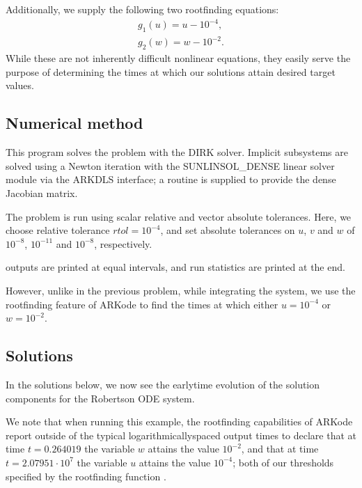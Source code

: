 \documentclass[letterpaper,10pt,english]{sphinxmanual}
\begin{document}
\sphinxAtStartPar
Additionally, we supply the following two root\sphinxhyphen{}finding equations:
\begin{equation*}
\begin{split}g_1(u) = u - 10^{-4}, \\
g_2(w) = w - 10^{-2}.\end{split}
\end{equation*}
\sphinxAtStartPar
While these are not inherently difficult nonlinear equations, they
easily serve the purpose of determining the times at which our
solutions attain desired target values.


\subsection{Numerical method}
\label{\detokenize{c_serial:id16}}
\sphinxAtStartPar
This program solves the problem with the DIRK solver.  Implicit
subsystems are solved using a Newton iteration with the
SUNLINSOL\_DENSE linear solver module via the ARKDLS interface; a
routine is supplied to provide the dense Jacobian matrix.

\sphinxAtStartPar
The problem is run using scalar relative and vector absolute
tolerances.  Here, we choose relative tolerance \(rtol=10^{-4}\),
and set absolute tolerances on \(u\), \(v\) and \(w\) of
\(10^{-8}\), \(10^{-11}\) and \(10^{-8}\), respectively.

 outputs are printed at equal intervals, and run statistics are
printed at the end.

\sphinxAtStartPar
However, unlike in the previous problem, while integrating the system,
we use the rootfinding feature of ARKode to find the times at which
either \(u=10^{-4}\) or \(w=10^{-2}\).


\subsection{Solutions}
\label{\detokenize{c_serial:id17}}
\sphinxAtStartPar
In the solutions below, we now see the early\sphinxhyphen{}time evolution of the
solution components for the Robertson ODE system.

\begin{figure}[htbp]
\centering

\noindent{}
\end{figure}

\sphinxAtStartPar
We note that when running this example, the root\sphinxhyphen{}finding capabilities
of ARKode report outside of the typical logarithmically\sphinxhyphen{}spaced output
times to declare that at time \(t=0.264019\) the variable
\(w\) attains the value \(10^{-2}\), and that at time
\(t=2.07951\cdot10^{7}\) the variable \(u\) attains the value
\(10^{-4}\); both of our thresholds specified by the root\sphinxhyphen{}finding
function .
\end{document}
